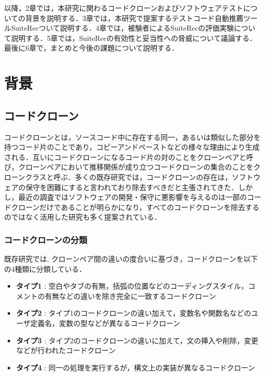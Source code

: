 \documentclass[12pt]{jarticle} %
\begin{document}
以降，2章では，本研究に関わるコードクローンおよびソフトウェアテストについての背景を説明する．3章では，本研究で提案するテストコード自動推薦ツール{\sf SuiteRec}ついて説明する．4章では，被験者による{\sf SuiteRec}の評価実験について説明する．5章では，{\sf SuiteRec}の有効性と妥当性への脅威について議論する．最後に6章で，まとめと今後の課題について説明する．


\newpage
\section{背景}
\subsection{コードクローン}

コードクローンとは，ソースコード中に存在する同一，あるいは類似した部分を持つコード片のことであり，コピーアンドペーストなどの様々な理由により生成される\cite{c1}．互いにコードクローンになるコード片の対のことをクローンペアと呼び，クローンペアにおいて推移関係が成り立つコードクローンの集合のことをクローンクラスと呼ぶ．多くの既存研究\cite{c2,c3,c1}では，コードクローンの存在は，ソフトウェアの保守を困難にすると言われており除去すべきだと主張されてきた．しかし，最近の調査ではソフトウェアの開発・保守に悪影響を与えるのは一部のコードクローンだけであることが明らかになり，すべてのコードクローンを除去するのではなく活用した研究も多く提案されている\cite{gilligan10,gilligan34,skipper,Zhang2017}．

\subsubsection{コードクローンの分類}
既存研究\cite{c5,c4}では, クローンペア間の違いの度合いに基づき，コードクローンを以下の4種類に分類している．

\begin{itemize}
\item \textbf{タイプ1} : 空白やタブの有無，括弧の位置などのコーディングスタイル，コメントの有無などの違いを除き完全に一致するコードクローン
\item \textbf{タイプ2} : タイプ1のコードクローンの違い加えて，変数名や関数名などのユーザ定義名，変数の型などが異なるコードクローン
\item \textbf{タイプ3} : タイプ2のコードクローンの違いに加えて，文の挿入や削除，変更などが行われたコードクローン
\item \textbf{タイプ4} : 同一の処理を実行するが，構文上の実装が異なるコードクローン
\end{itemize}
\end{document}
